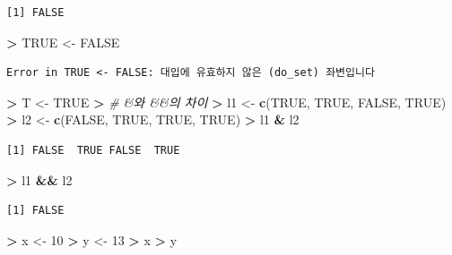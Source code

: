 \documentclass[11pt,a4paper]{book}
\newenvironment{Shaded}{\begin{snugshade}}{\end{snugshade}}
\newcommand{\KeywordTok}[1]{\textcolor[rgb]{0.13,0.29,0.53}{\textbf{#1}}}
\newcommand{\DecValTok}[1]{\textcolor[rgb]{0.00,0.00,0.81}{#1}}
\newcommand{\StringTok}[1]{\textcolor[rgb]{0.31,0.60,0.02}{#1}}
\newcommand{\CommentTok}[1]{\textcolor[rgb]{0.56,0.35,0.01}{\textit{#1}}}
\newcommand{\OtherTok}[1]{\textcolor[rgb]{0.56,0.35,0.01}{#1}}
\newcommand{\OperatorTok}[1]{\textcolor[rgb]{0.81,0.36,0.00}{\textbf{#1}}}
\newcommand{\ErrorTok}[1]{\textcolor[rgb]{0.64,0.00,0.00}{\textbf{#1}}}
\newcommand{\NormalTok}[1]{#1}
\theoremstyle{definition}
\theoremstyle{definition}
\theoremstyle{definition}
\theoremstyle{remark}
\begin{document}
\begin{verbatim}
[1] FALSE
\end{verbatim}

\begin{Shaded}
\begin{Highlighting}[]
\OperatorTok{>}\StringTok{ }\OtherTok{TRUE}\NormalTok{ <-}\StringTok{ }\OtherTok{FALSE}
\end{Highlighting}
\end{Shaded}

\begin{verbatim}
Error in TRUE <- FALSE: 대입에 유효하지 않은 (do_set) 좌변입니다
\end{verbatim}

\begin{Shaded}
\begin{Highlighting}[]
\OperatorTok{>}\StringTok{ }\NormalTok{T <-}\StringTok{ }\OtherTok{TRUE}
\OperatorTok{>}\StringTok{ }\CommentTok{# &와 &&의 차이}
\ErrorTok{>}\StringTok{ }\NormalTok{l1 <-}\StringTok{ }\KeywordTok{c}\NormalTok{(}\OtherTok{TRUE}\NormalTok{, }\OtherTok{TRUE}\NormalTok{, }\OtherTok{FALSE}\NormalTok{, }\OtherTok{TRUE}\NormalTok{)}
\OperatorTok{>}\StringTok{ }\NormalTok{l2 <-}\StringTok{ }\KeywordTok{c}\NormalTok{(}\OtherTok{FALSE}\NormalTok{, }\OtherTok{TRUE}\NormalTok{, }\OtherTok{TRUE}\NormalTok{, }\OtherTok{TRUE}\NormalTok{)}
\OperatorTok{>}\StringTok{ }\NormalTok{l1 }\OperatorTok{&}\StringTok{ }\NormalTok{l2}
\end{Highlighting}
\end{Shaded}

\begin{verbatim}
[1] FALSE  TRUE FALSE  TRUE
\end{verbatim}

\begin{Shaded}
\begin{Highlighting}[]
\OperatorTok{>}\StringTok{ }\NormalTok{l1 }\OperatorTok{&&}\StringTok{ }\NormalTok{l2}
\end{Highlighting}
\end{Shaded}

\begin{verbatim}
[1] FALSE
\end{verbatim}

\begin{Shaded}
\begin{Highlighting}[]
\OperatorTok{>}\StringTok{ }\NormalTok{x <-}\StringTok{ }\DecValTok{10}
\OperatorTok{>}\StringTok{ }\NormalTok{y <-}\StringTok{ }\DecValTok{13}
\OperatorTok{>}\StringTok{ }\NormalTok{x }\OperatorTok{>}\StringTok{ }\NormalTok{y}
\end{Highlighting}
\end{Shaded}
\end{document}
